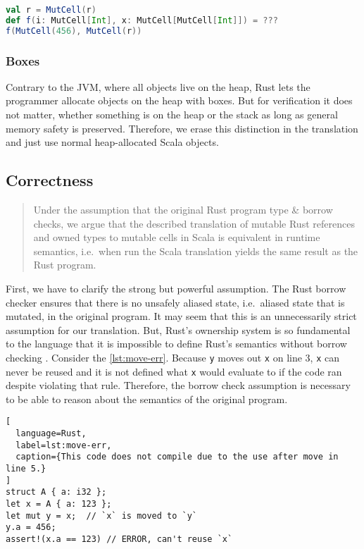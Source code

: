 \begin{lstlisting}[language=Scala]
val r = MutCell(r)
def f(i: MutCell[Int], x: MutCell[MutCell[Int]]) = ???
f(MutCell(456), MutCell(r))
\end{lstlisting}

\subsubsection{Boxes}

Contrary to the JVM, where all objects live on the heap, Rust lets the
programmer allocate objects on the heap with boxes. But for verification it does
not matter, whether something is on the heap or the stack as long as general
memory safety is preserved. Therefore, we erase this distinction in the
translation and just use normal heap-allocated Scala objects.

\subsection{Correctness}
\label{correctness-claim}

\begin{quote}
Under the assumption that the original Rust program type \& borrow
checks, we argue that the described translation of mutable Rust
references and owned types to mutable cells in Scala is equivalent in
runtime semantics, i.e.~when run the Scala translation yields the same
result as the Rust program.
\end{quote}

First, we have to clarify the strong but powerful assumption. The Rust
borrow checker ensures that there is no unsafely aliased state,
i.e.~aliased state that is mutated, in the original program. It may seem
that this is an unnecessarily strict assumption for our translation.
But, Rust's ownership system is so fundamental to the language that it
is impossible to define Rust's semantics without borrow checking
\cite{krust}. Consider the \autoref{lst:move-err}. Because
\passthrough{\lstinline!y!} moves out \passthrough{\lstinline!x!} on
line 3, \passthrough{\lstinline!x!} can never be reused and it is not
defined what \passthrough{\lstinline!x!} would evaluate to if the code
ran despite violating that rule. Therefore, the borrow check assumption
is necessary to be able to reason about the semantics of the original
program.

\begin{lstlisting}[
  language=Rust,
  label=lst:move-err,
  caption={This code does not compile due to the use after move in line 5.}
]
struct A { a: i32 };
let x = A { a: 123 };
let mut y = x;  // `x` is moved to `y`
y.a = 456;
assert!(x.a == 123) // ERROR, can't reuse `x`
\end{lstlisting}

